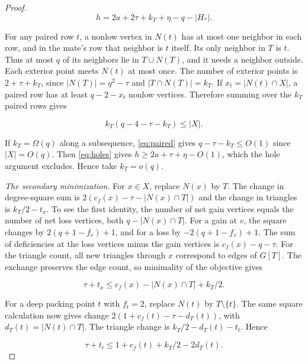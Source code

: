 \documentclass[11pt,reqno]{amsart}
\theoremstyle{definition}
\theoremstyle{remark}
\numberwithin{equation}{section}
\begin{document}
\begin{proof}
\begin{equation}\label{eq:holes}
h=2a+2\tau+k_T+\eta-q-|H_*|.
\end{equation}

For any paired row \(t\), a nonlow vertex in \(N(t)\) has at most one neighbor in each row, and in the mate's row that neighbor is \(t\) itself. Its only neighbor in \(T\) is \(t\). Thus at most \(q\) of its neighbors lie in \(T\cup N(T)\), and it needs a neighbor outside. Each exterior point meets \(N(t)\) at most once. The number of exterior points is \(2+\tau+k_T\), since \(|N(T)|=q^2-\tau\) and \(|T\cap N(T)|=k_T\). If \(x_t=|N(t)\cap X|\), a paired row has at least \(q-2-x_t\) nonlow vertices. Therefore summing over the \(k_T\) paired rows gives

\begin{equation}\label{eq:paired}
k_T(q-4-\tau-k_T)\le |X|.
\end{equation}

If \(k_T=\Omega(q)\) along a subsequence, \eqref{eq:paired} gives \(q-\tau-k_T\le O(1)\) since \(|X|=O(q)\). Then \eqref{eq:holes} gives \(h\ge2a+\tau+\eta-O(1)\), which the hole argument excludes. Hence take \(k_T=o(q)\).

\textit{The secondary minimization.} For \(x\in X\), replace \(N(x)\) by \(T\). The change in degree-square sum is \(2(c_f(x)-\tau-|N(x)\cap T|)\) and the change in triangles is \(k_T/2-t_x\). To see the first identity, the number of net gain vertices equals the number of net loss vertices, both \(q-|N(x)\cap T|\). For a gain at \(v\), the square changes by \(2(q+1-f_v)+1\), and for a loss by \(-2(q+1-f_v)+1\). The sum of deficiencies at the loss vertices minus the gain vertices is \(c_f(x)-q-\tau\). For the triangle count, all new triangles through \(x\) correspond to edges of \(G[T]\). The exchange preserves the edge count, so minimality of the objective gives

\begin{equation}\label{eq:outside-exchange}
\tau+t_x\le c_f(x)-|N(x)\cap T|+k_T/2.
\end{equation}

For a deep packing point \(t\) with \(f_t=2\), replace \(N(t)\) by \(T\setminus\{t\}\). The same square calculation now gives change \(2(1+c_f(t)-\tau-d_T(t))\), with \(d_T(t)=|N(t)\cap T|\). The triangle change is \(k_T/2-d_T(t)-t_t\). Hence

\begin{equation}\label{eq:inside-exchange}
\tau+t_t\le1+c_f(t)+k_T/2-2d_T(t).
\end{equation}


\end{proof}
\end{document}
